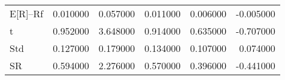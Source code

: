 \begin{tabular}{lrrrrr}
\toprule
\midrule
E[R]--Rf & 0.010000 & 0.057000 & 0.011000 & 0.006000 & -0.005000 \\
t & 0.952000 & 3.648000 & 0.914000 & 0.635000 & -0.707000 \\
Std & 0.127000 & 0.179000 & 0.134000 & 0.107000 & 0.074000 \\
SR & 0.594000 & 2.276000 & 0.570000 & 0.396000 & -0.441000 \\
\bottomrule
\end{tabular}
